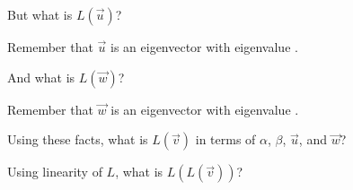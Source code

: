\documentclass{ximera}
\begin{document}
\begin{question}
  But what is $L(\vec{u})$?
  \begin{solution}
    \begin{hint}
      \begin{question}
        \begin{solution}
          Remember that $\vec{u}$ is an eigenvector with eigenvalue .
        \end{solution}
      \end{question}
    \end{hint}
    
    \begin{multiple-choice}
    \end{multiple-choice}   
  \end{solution}
  
  And what is $L(\vec{w})$?
  \begin{solution}
    \begin{hint}
      \begin{question}
        \begin{solution}
          Remember that $\vec{w}$ is an eigenvector with eigenvalue .
        \end{solution}
      \end{question}
    \end{hint}
    
    \begin{multiple-choice}
    \end{multiple-choice}   
  \end{solution}
  
  Using these facts, what is $L(\vec{v})$ in terms of $\alpha$, $\beta$, $\vec{u}$, and $\vec{w}$?
  \begin{solution}
    \begin{multiple-choice}
    \end{multiple-choice} 
  \end{solution}
  
  \begin{solution}
    \begin{hint}
      \begin{question}
        \begin{solution}
          Using linearity of $L$, what is $L(L(\vec{v}))$?


\end{solution}
\end{question}
\end{hint}
\end{solution}
\end{question}
\end{document}

